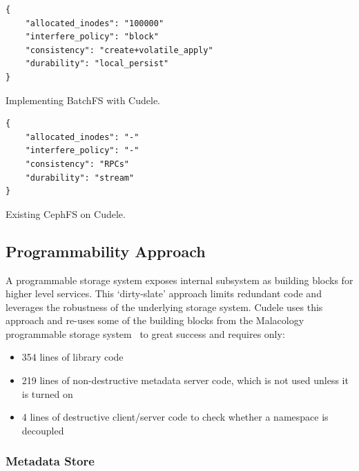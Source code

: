 \begin{listing}
\begin{verbatim}
{     
    "allocated_inodes": "100000"
    "interfere_policy": "block"
    "consistency": "create+volatile_apply"
    "durability": "local_persist"
}
\end{verbatim}
\caption{Implementing BatchFS with Cudele.}
\label{src:batchfs}
\end{listing}

\begin{listing}
\begin{verbatim}
{     
    "allocated_inodes": "-"
    "interfere_policy": "-"
    "consistency": "RPCs"
    "durability": "stream"
}
\end{verbatim}
\caption{Existing CephFS on Cudele.}
\label{src:batchfs}
\end{listing}

\subsection{Programmability Approach}

A programmable storage system exposes internal subsystem as building blocks for
higher level services. This `dirty-slate' approach limits redundant code and
leverages the robustness of the underlying storage system. Cudele uses this
approach and re-uses some of the building blocks from the Malacology
programmable storage system~\cite{sevilla:eurosys17} to great success and
requires only:

\begin{itemize}

  \item 354 lines of library code

  \item 219 lines of non-destructive metadata server code, which is not used
  unless it is turned on

  \item 4 lines of destructive client/server code to check whether a namespace
  is decoupled

\end{itemize}

\subsubsection{Metadata Store}
\label{sec:metadata-store}

